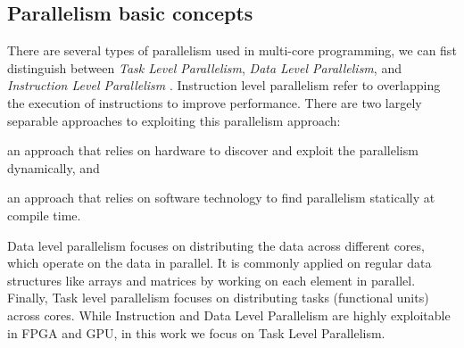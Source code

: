 
\subsection{Parallelism basic concepts}
There are several types of parallelism used in multi-core programming, we can fist distinguish between \emph{Task Level Parallelism}, \emph{Data Level Parallelism}, and \emph{Instruction Level Parallelism} \cite{computerarchitecture}. Instruction level parallelism refer to overlapping the execution of instructions to improve performance. There are two largely separable approaches to exploiting this parallelism approach: \begin{enumerate*} \item an approach that relies on hardware to discover and exploit the parallelism dynamically, and \item an approach that relies on software technology to find parallelism statically at compile time.\end{enumerate*} Data level parallelism focuses on distributing the data across different cores, which operate on the data in parallel. It is commonly applied on regular data structures like arrays and matrices by working on each element in parallel. Finally, Task level parallelism focuses on distributing tasks (functional units) across cores. While Instruction and Data Level Parallelism are highly exploitable in FPGA and GPU, in this work we focus on Task Level Parallelism.
